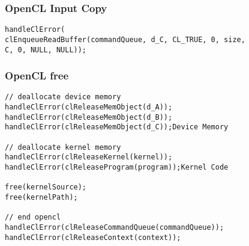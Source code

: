\documentclass[main.tex,fontsize=8pt,paper=a4,paper=portrait,DIV=calc,]{scrartcl}
\begin{document}
\subsubsection{OpenCL Input Copy}
\begin{lstlisting}
handleClError(
clEnqueueReadBuffer(commandQueue, d_C, CL_TRUE, 0, size,
C, 0, NULL, NULL));
\end{lstlisting}

\subsubsection{OpenCL free}
\begin{lstlisting}
// deallocate device memory 
handleClError(clReleaseMemObject(d_A));
handleClError(clReleaseMemObject(d_B));
handleClError(clReleaseMemObject(d_C));Device Memory

// deallocate kernel memory
handleClError(clReleaseKernel(kernel));
handleClError(clReleaseProgram(program));Kernel Code

free(kernelSource);
free(kernelPath);

// end opencl
handleClError(clReleaseCommandQueue(commandQueue));
handleClError(clReleaseContext(context));
\end{lstlisting}
\end{document}
